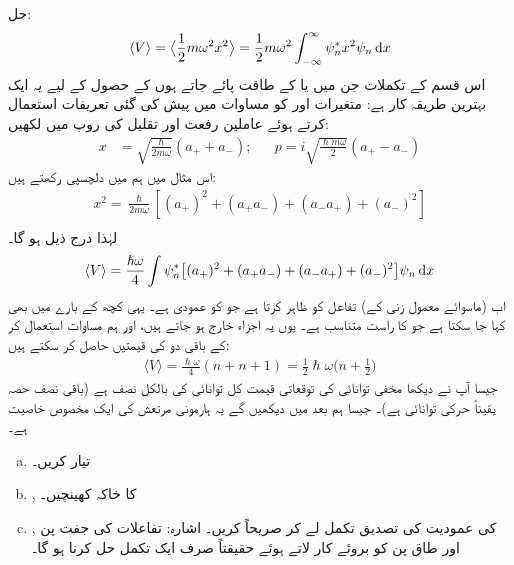 حل:
\begin{align*}
\langle V \rangle =\big\langle\frac{1}{2}m\omega ^{2}x^{2}\big\rangle=\frac{1}{2}m\omega ^{2}\int_{-\infty}^{\infty}\psi_{n}^{*}x^{2}\psi_{n}\dif{x}
\end{align*}
اس قسم کے تکملات جن میں  یا  کے طاقت پائے جاتے ہوں کے حصول کے لیے یہ ایک بہترین طریقہ کار ہے: متغیرات  اور  کو مساوات  میں پیش کی گئی تعریفات استعمال کرتے ہوئے عاملین رفعت اور تقلیل کی روپ میں لکھیں:
\begin{align}
x&=\sqrt{\frac{\hslash}{2m\omega}}(a_++a_-); && p=i\sqrt{\frac{\hslash m \omega}{2}}(a_+-a_-)
\end{align}
اس مثال میں ہم  میں دلچسپی رکھتے ہیں:
\begin{align*}
x^{2}=\frac{\hslash}{2m\omega}[(a_{+})^{2}+(a_{+}a_{-})+(a_{-}a_{+})+(a_{-})^{2}] \\
\end{align*}
لہٰذا درج ذیل ہو گا۔
\begin{align*}
\langle V \rangle =\frac{\hslash\omega}{4}\int \psi_{n}^{*}\big[(a_{+})^{2}+(a_{+}a_{-})+(a_{-}a_{+})+(a_{-})^{2}\big ]\psi_{n}\dif{x}
\end{align*}
اب (ماسوائے معمول زنی کے)  تفاعل  کو ظاہر کرتا ہے جو  کو عمودی ہے۔ یہی کچھ  کے بارے میں بھی کہا جا سکتا ہے جو  کا راست متناسب ہے۔ یوں یہ اجزاء خارج ہو جاتے ہیں، اور ہم مساوات  استعمال کر کے باقی دو کی قیمتیں حاصل کر سکتے ہیں:
\begin{align*}
\langle V \rangle =\frac{\hslash\omega}{4}(n+n+1)=\frac{1}{2}\hslash\omega\big (n+\frac{1}{2} \big )
\end{align*}
جیسا آپ نے دیکھا مخفی توانائی کی توقعاتی قیمت کل توانائی کی بالکل نصف ہے (باقی نصف حصہ یقیناً حرکی توانائی ہے)۔ جیسا ہم بعد میں دیکھیں گے یہ ہارمونی مرتعش کی ایک مخصوص خاصیت ہے۔
\begin{enumerate}[a.]
\item
{} تیار کریں۔
\item
{}, کا خاکہ کھینچیں۔
\item
{}, کی عمودیت کی تصدیق تکمل لے کر صریحاً کریں۔ اشارہ: تفاعلات کی جفت پن اور طاق پن کو بروئے کار لاتے ہوئے حقیقتاً صرف ایک تکمل حل کرنا ہو گا۔
\end{enumerate}
